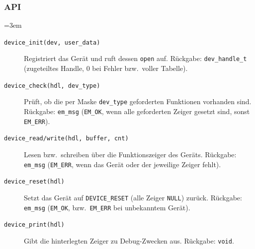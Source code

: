 \subsubsection*{API}
{\sloppy\emergencystretch=3em
\begin{description}
\item[\texttt{device\_init(dev, user\_data)}] Registriert das Gerät und ruft
  dessen \verb|open| auf. Rückgabe: \verb|dev_handle_t| (zugeteiltes Handle,
  $0$ bei Fehler bzw.\ voller Tabelle).
\item[\texttt{device\_check(hdl, dev\_type)}] Prüft, ob die per Maske
  \verb|dev_type| geforderten Funktionen vorhanden sind. Rückgabe:
  \verb|em_msg| (\verb|EM_OK|, wenn alle geforderten Zeiger gesetzt sind,
  sonst \verb|EM_ERR|).
\item[\texttt{device\_read/write(hdl, buffer, cnt)}] Lesen bzw.\ schreiben über
  die Funktionszeiger des Geräts. Rückgabe: \verb|em_msg| (\verb|EM_ERR|, wenn
  das Gerät oder der jeweilige Zeiger fehlt).
\item[\texttt{device\_reset(hdl)}] Setzt das Gerät auf \verb|DEVICE_RESET|
  (alle Zeiger \verb|NULL|) zurück. Rückgabe: \verb|em_msg| (\verb|EM_OK|,
  bzw.\ \verb|EM_ERR| bei unbekanntem Gerät).
\item[\texttt{device\_print(hdl)}] Gibt die hinterlegten Zeiger zu
  Debug-Zwecken aus. Rückgabe: \verb|void|.
\end{description}
\par}
